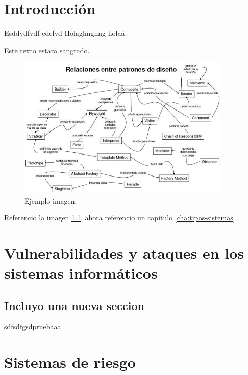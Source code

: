 \chapter{Introducción}
\label{cha:introduccion}


Esddvdfvdf \cite{ejemplo} edefvd Holaghnghng holaá.

Este texto estara sangrado.

\begin{figure}[tphb]
  \centering
  \includegraphics[width=4in]{ejemplo-imagen.jpg}
  \caption{Ejemplo imagen.}
  \label{img:imagen-ejemplo}
\end{figure}

Referencio la imagen \ref{img:imagen-ejemplo}, ahora referencio un capitulo \ref{cha:tipos-sistemas}


\chapter{Vulnerabilidades y ataques en los sistemas informáticos}
\label{cha:vulneravilidades-y-ataques}

\section{Incluyo una nueva seccion}
\label{sec:prueba}
sdfsdfgsdpruebaaa



\chapter{Sistemas de riesgo}
\label{cha:sistemas-de-riesgo}




